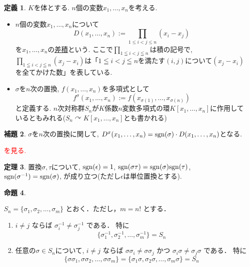 \documentclass[dvipdfmx,a4paper,11pt]{article} %
\newcommand{\sgn}{{\rm sgn}}
\newcommand{\xr}[1]{\textcolor{red}{#1}}
\theoremstyle{definition}
\newtheorem{thm}{定理}
\newtheorem{lem}[thm]{補題}
\newtheorem{prop}[thm]{命題}
\newtheorem{dfn}[thm]{定義}
\begin{document}
\begin{dfn}
$K$を体とする. $n$個の変数$x_1, \ldots, x_n$を考える. 

\begin{itemize}
\item $n$個の変数$x_1, \ldots, x_n$について
$$
D(x_1, \ldots, x_n):=\prod_{1 \le i < j \le n} (x_i - x_j)
$$
を$x_1, \ldots, x_n$の\underline{差積}という. 
ここで$\prod_{1 \leqq i < j \leqq n}$は積の記号で, $\prod_{1 \leqq i < j \leqq n} (x_j - x_i)$は「$1 \leqq i < j \leqq n$を満たす$(i,j)$について$ (x_j - x_i)$を全てかけた数」を表している.

\item $\sigma$を$n$次の置換, 
$f(x_1, \ldots, x_n)$を多項式として
$$
f^{\sigma}(x_1, \ldots, x_n) :=f(x_{\sigma(1)}, \ldots, x_{\sigma(n)})
$$
と定義する. 
$n$次対称群$S_n$が$K$係数$n$変数多項式の環$K[x_1, \ldots, x_n]$に作用しているともみれる($S_n \curvearrowright K[x_1, \ldots, x_n]$とも書かれる)
\end{itemize}
\end{dfn}


\begin{lem}
$\sigma$を$n$次の置換に関して, 
$D^{\sigma}(x_1, \ldots, x_n)=\sgn(\sigma) \cdot D(x_1, \ldots, x_n)$となる. 
\end{lem}

 \xr{\cite[例 3.1.5]{O}を見る.}

\begin{thm}\cite[定理 3.1.6]{O}
置換$\sigma, \tau$について, 
    $\sgn(\epsilon) = 1$, $\sgn(\sigma \tau) = \sgn(\sigma) \sgn(\tau) $, $\sgn(\sigma^{-1}) = \sgn(\sigma)$, が成り立つ(ただし$\epsilon$は単位置換とする).
\end{thm}


\begin{prop}
\cite[命題 3.1.7]{O}

\( S_n=\{\sigma_1,\sigma_2,\ldots,\sigma_m\} \) とおく．ただし，\( m=n! \) とする．

\begin{enumerate}
\item \( i\neq j \) ならば \( \sigma_i^{-1}\neq \sigma_j^{-1} \) である． 
特に\[ \{\sigma_1^{-1},\sigma_2^{-1},\ldots,\sigma_m^{-1}\}=S_n \] 
\item 任意の\( \sigma\in S_n \)について, \( i\neq j \) ならば \( \sigma\sigma_i\neq \sigma\sigma_j \)
かつ \( \sigma_i\sigma\neq \sigma_j\sigma \) である．
特に
\[ 
\{\sigma\sigma_1,\sigma\sigma_2,\ldots,\sigma\sigma_m\}=  \{\sigma_1\sigma,\sigma_2\sigma,\ldots,\sigma_m\sigma\}=S_n \]
\end{enumerate}
\end{prop}
\end{document}
